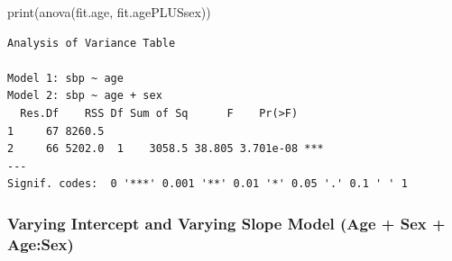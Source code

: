 \documentclass[
  letterpaper,
]{scrbook}
\newenvironment{Shaded}{\begin{snugshade}}{\end{snugshade}}
\newcommand{\FunctionTok}[1]{\textcolor[rgb]{0.28,0.35,0.67}{#1}}
\newcommand{\NormalTok}[1]{\textcolor[rgb]{0.00,0.23,0.31}{#1}}
\begin{document}
\begin{Shaded}
\begin{Highlighting}[]
\FunctionTok{print}\NormalTok{(}\FunctionTok{anova}\NormalTok{(fit.age, fit.agePLUSsex))}
\end{Highlighting}
\end{Shaded}

\begin{verbatim}
Analysis of Variance Table

Model 1: sbp ~ age
Model 2: sbp ~ age + sex
  Res.Df    RSS Df Sum of Sq      F    Pr(>F)    
1     67 8260.5                                  
2     66 5202.0  1    3058.5 38.805 3.701e-08 ***
---
Signif. codes:  0 '***' 0.001 '**' 0.01 '*' 0.05 '.' 0.1 ' ' 1
\end{verbatim}

\subsubsection{Varying Intercept and Varying Slope Model (Age + Sex +
Age:Sex)}\label{varying-intercept-and-varying-slope-model-age-sex-agesex}
\end{document}
